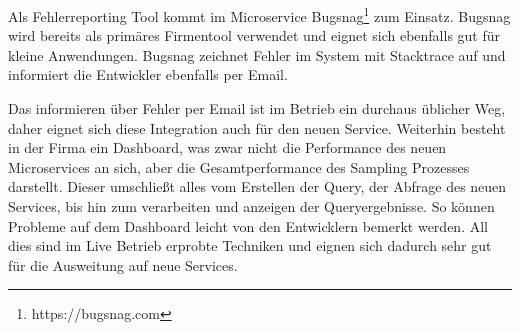 Als Fehlerreporting Tool kommt im Microservice Bugsnag\footnote{https://bugsnag.com} zum Einsatz. Bugsnag wird bereits als primäres Firmentool verwendet und eignet sich ebenfalls gut für kleine Anwendungen. Bugsnag zeichnet Fehler im System mit Stacktrace auf und informiert die Entwickler ebenfalls per Email.

Das informieren über Fehler per Email ist im Betrieb ein durchaus üblicher Weg, daher eignet sich diese Integration auch für den neuen Service. Weiterhin besteht in der Firma ein Dashboard, was zwar nicht die Performance des neuen Microservices an sich, aber die Gesamtperformance des Sampling Prozesses darstellt. Dieser umschließt alles vom Erstellen der Query, der Abfrage des neuen Services, bis hin zum verarbeiten und anzeigen der Queryergebnisse. So können Probleme auf dem Dashboard leicht von den Entwicklern bemerkt werden. All dies sind im Live Betrieb erprobte Techniken und eignen sich dadurch sehr gut für die Ausweitung auf neue Services.